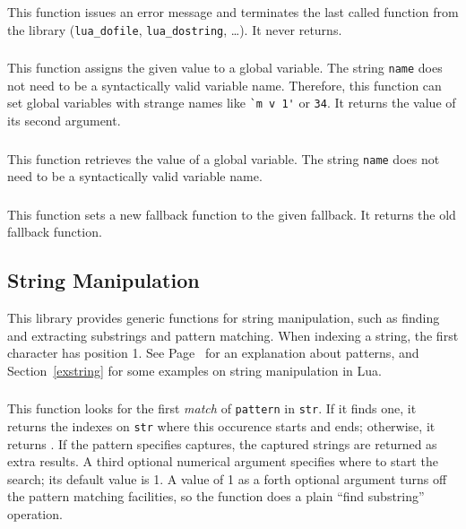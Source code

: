 \subsubsection*{}\label{pdf-error}
This function issues an error message and terminates
the last called function from the library
(\verb'lua_dofile', \verb'lua_dostring', \ldots).
It never returns.

\subsubsection*{}
This function assigns the given value to a global variable.
The string \verb'name' does not need to be a syntactically valid variable name.
Therefore, this function can set global variables with strange names like
\verb|`m v 1'| or \verb'34'.
It returns the value of its second argument.

\subsubsection*{}
This function retrieves the value of a global variable.
The string \verb'name' does not need to be a syntactically valid variable name.

\subsubsection*{}
This function sets a new fallback function to the given fallback.
It returns the old fallback function.

\subsection{String Manipulation}
This library provides generic functions for string manipulation,
such as finding and extracting substrings and pattern matching.
When indexing a string, the first character has position 1.
See Page~\pageref{pm} for an explanation about patterns,
and Section~\ref{exstring} for some examples on string manipulation
in Lua.

\subsubsection*{}
This function looks for the first {\em match} of
\verb-pattern- in \verb-str-.
If it finds one, it returns the indexes on \verb-str-
where this occurence starts and ends;
otherwise, it returns \nil.
If the pattern specifies captures,
the captured strings are returned as extra results.
A third optional numerical argument specifies where to start the search;
its default value is 1.
A value of 1 as a forth optional argument
turns off the pattern matching facilities,
so the function does a plain ``find substring'' operation.

